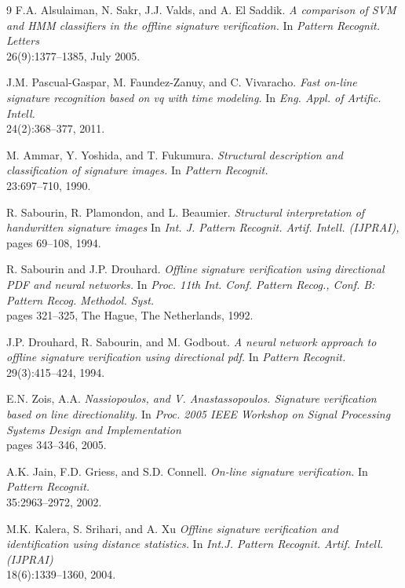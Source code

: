 \begin{thebibliography}{9}
F.A. Alsulaiman, N. Sakr, J.J. Valds, and A. El Saddik.
\textit{ A comparison of SVM and HMM classifiers in the offline signature verification. } In \textit{Pattern Recognit. Letters} \\
26(9):1377–1385, July 2005.

J.M. Pascual-Gaspar, M. Faundez-Zanuy, and C. Vivaracho.
\textit{ Fast on-line signature recognition based on vq with time modeling. } In \textit{Eng. Appl. of Artific. Intell.} \\
24(2):368–377, 2011.

M. Ammar, Y. Yoshida, and T. Fukumura.
\textit{ Structural description and classification of signature images. } In \textit{Pattern Recognit.} \\
23:697–710, 1990.

R. Sabourin, R. Plamondon, and L. Beaumier.
\textit{ Structural interpretation of handwritten signature images } In \textit{Int. J. Pattern Recognit. Artif. Intell. (IJPRAI),} \\
pages 69–108, 1994.

R. Sabourin and J.P. Drouhard.
\textit{ Offline signature verification using directional PDF and neural networks. } In \textit{Proc. 11th Int. Conf. Pattern Recog., Conf. B: Pattern Recog. Methodol. Syst.} \\
pages 321–325, The Hague, The
Netherlands, 1992.

J.P. Drouhard, R. Sabourin, and M. Godbout.
\textit{ A neural network approach to offline signature verification using directional pdf. } In \textit{Pattern Recognit.} \\
29(3):415–424, 1994.

E.N. Zois, A.A.
\textit{ Nassiopoulos, and V. Anastassopoulos. Signature verification based on line directionality. } In \textit{Proc. 2005 IEEE Workshop on Signal Processing Systems Design and Implementation} \\
pages 343–346, 2005.

A.K. Jain, F.D. Griess, and S.D. Connell.
\textit{ On-line signature verification. } In \textit{Pattern Recognit.} \\
35:2963–2972, 2002.

M.K. Kalera, S. Srihari, and A. Xu
\textit{ Offline signature verification and identification using distance statistics. } In \textit{Int.J. Pattern Recognit. Artif. Intell. (IJPRAI)} \\
18(6):1339–1360, 2004.


\end{thebibliography}
